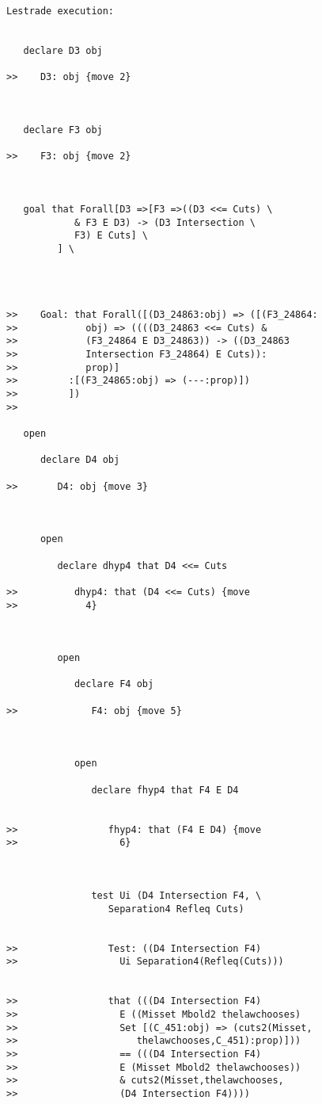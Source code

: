 \documentclass[12pt]{article}
\begin{document}
\begin{verbatim}Lestrade execution:


   declare D3 obj

>>    D3: obj {move 2}



   declare F3 obj

>>    F3: obj {move 2}



   goal that Forall[D3 =>[F3 =>((D3 <<= Cuts) \
            & F3 E D3) -> (D3 Intersection \
            F3) E Cuts] \
         ] \
      



>>    Goal: that Forall([(D3_24863:obj) => ([(F3_24864:
>>            obj) => ((((D3_24863 <<= Cuts) &
>>            (F3_24864 E D3_24863)) -> ((D3_24863
>>            Intersection F3_24864) E Cuts)):
>>            prop)]
>>         :[(F3_24865:obj) => (---:prop)])
>>         ])
>>      

   open

      declare D4 obj

>>       D4: obj {move 3}



      open

         declare dhyp4 that D4 <<= Cuts

>>          dhyp4: that (D4 <<= Cuts) {move
>>            4}



         open

            declare F4 obj

>>             F4: obj {move 5}



            open

               declare fhyp4 that F4 E D4


>>                fhyp4: that (F4 E D4) {move
>>                  6}



               test Ui (D4 Intersection F4, \
                  Separation4 Refleq Cuts)


>>                Test: ((D4 Intersection F4)
>>                  Ui Separation4(Refleq(Cuts)))


>>                that (((D4 Intersection F4)
>>                  E ((Misset Mbold2 thelawchooses)
>>                  Set [(C_451:obj) => (cuts2(Misset,
>>                     thelawchooses,C_451):prop)]))
>>                  == (((D4 Intersection F4)
>>                  E (Misset Mbold2 thelawchooses))
>>                  & cuts2(Misset,thelawchooses,
>>                  (D4 Intersection F4))))




\end{verbatim}
\end{document}
